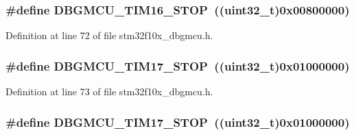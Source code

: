 \subsubsection[{\texorpdfstring{D\+B\+G\+M\+C\+U\+\_\+\+T\+I\+M16\+\_\+\+S\+T\+OP}{DBGMCU_TIM16_STOP}}]{\setlength{\rightskip}{0pt plus 5cm}\#define D\+B\+G\+M\+C\+U\+\_\+\+T\+I\+M16\+\_\+\+S\+T\+OP~(({\bf uint32\+\_\+t})0x00800000)}\hypertarget{group___d_b_g_m_c_u___exported___constants_ga8a0698403a9c76115bc607ee0149193f}{}\label{group___d_b_g_m_c_u___exported___constants_ga8a0698403a9c76115bc607ee0149193f}


Definition at line 72 of file stm32f10x\+\_\+dbgmcu.\+h.

\subsubsection[{\texorpdfstring{D\+B\+G\+M\+C\+U\+\_\+\+T\+I\+M17\+\_\+\+S\+T\+OP}{DBGMCU_TIM17_STOP}}]{\setlength{\rightskip}{0pt plus 5cm}\#define D\+B\+G\+M\+C\+U\+\_\+\+T\+I\+M17\+\_\+\+S\+T\+OP~(({\bf uint32\+\_\+t})0x01000000)}\hypertarget{group___d_b_g_m_c_u___exported___constants_gabf3a93a60431c892bdf36ff02081badc}{}\label{group___d_b_g_m_c_u___exported___constants_gabf3a93a60431c892bdf36ff02081badc}


Definition at line 73 of file stm32f10x\+\_\+dbgmcu.\+h.

\subsubsection[{\texorpdfstring{D\+B\+G\+M\+C\+U\+\_\+\+T\+I\+M17\+\_\+\+S\+T\+OP}{DBGMCU_TIM17_STOP}}]{\setlength{\rightskip}{0pt plus 5cm}\#define D\+B\+G\+M\+C\+U\+\_\+\+T\+I\+M17\+\_\+\+S\+T\+OP~(({\bf uint32\+\_\+t})0x01000000)}\hypertarget{group___d_b_g_m_c_u___exported___constants_gabf3a93a60431c892bdf36ff02081badc}{}\label{group___d_b_g_m_c_u___exported___constants_gabf3a93a60431c892bdf36ff02081badc}



